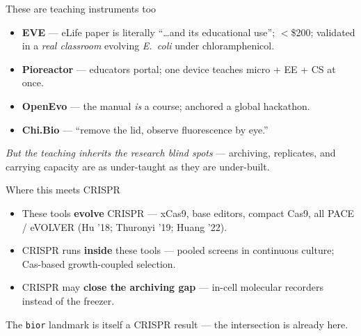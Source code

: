 \documentclass[aspectratio=169,11pt]{beamer}
\newcommand{\ac}[1]{\textcolor{accent}{\textbf{#1}}}
\begin{document}
\begin{frame}{These are teaching instruments too}
  \begin{itemize}
    \item \ac{EVE} --- eLife paper is literally ``\dots and its educational use''; $<$\$200; validated
      in a \emph{real classroom} evolving \emph{E.~coli} under chloramphenicol.
    \item \ac{Pioreactor} --- educators portal; one device teaches micro + EE + CS at once.
    \item \ac{OpenEvo} --- the manual \emph{is} a course; anchored a global hackathon.
    \item \ac{Chi.Bio} --- ``remove the lid, observe fluorescence by eye.''
  \end{itemize}
  \vspace{0.6em}
  \begin{center}
  \emph{But the teaching inherits the research blind spots} --- archiving, replicates, and
  carrying capacity are as under-taught as they are under-built.
  \end{center}
\end{frame}

\begin{frame}{Where this meets CRISPR}
  \begin{itemize}
    \item These tools \ac{evolve} CRISPR --- xCas9, base editors, compact Cas9, all PACE / eVOLVER (Hu '18; Thuronyi '19; Huang '22).
    \item CRISPR runs \ac{inside} these tools --- pooled screens in continuous culture; Cas-based growth-coupled selection.
    \item CRISPR may \ac{close the archiving gap} --- in-cell molecular recorders instead of the freezer.
  \end{itemize}
  \vspace{0.5em}
  \begin{center}\small The \texttt{bior} landmark is itself a CRISPR result --- the intersection is already here.\end{center}
\end{frame}
\end{document}
